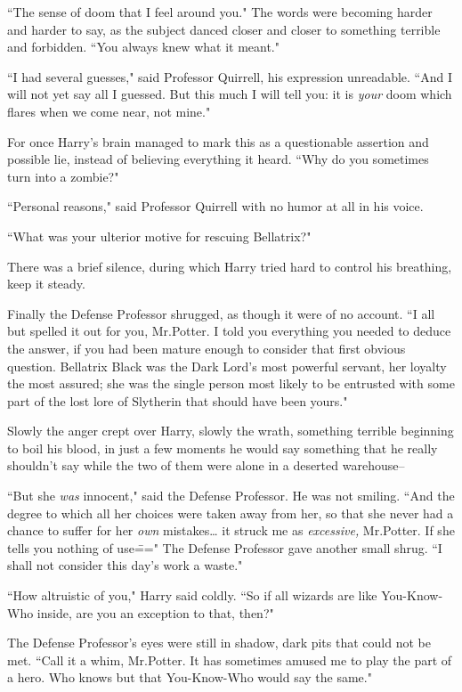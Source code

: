 ``The sense of doom that I feel around you." The words were becoming harder and harder to say, as the subject danced closer and closer to something terrible and forbidden. ``You always knew what it meant."

``I had several guesses," said Professor Quirrell, his expression unreadable. ``And I will not yet say all I guessed. But this much I will tell you: it is \emph{your} doom which flares when we come near, not mine."

For once Harry's brain managed to mark this as a questionable assertion and possible lie, instead of believing everything it heard. ``Why do you sometimes turn into a zombie?"

``Personal reasons," said Professor Quirrell with no humor at all in his voice.

``What was your ulterior motive for rescuing Bellatrix?"

There was a brief silence, during which Harry tried hard to control his breathing, keep it steady.

Finally the Defense Professor shrugged, as though it were of no account. ``I all but spelled it out for you, Mr.\?Potter. I told you everything you needed to deduce the answer, if you had been mature enough to consider that first obvious question. Bellatrix Black was the Dark Lord's most powerful servant, her loyalty the most assured; she was the single person most likely to be entrusted with some part of the lost lore of Slytherin that should have been yours."

Slowly the anger crept over Harry, slowly the wrath, something terrible beginning to boil his blood, in just a few moments he would say something that he really shouldn't say while the two of them were alone in a deserted warehouse\---

``But she \emph{was} innocent," said the Defense Professor. He was not smiling. ``And the degree to which all her choices were taken away from her, so that she never had a chance to suffer for her \emph{own} mistakes{\ldots} it struck me as \emph{excessive,} Mr.\?Potter. If she tells you nothing of use\===" The Defense Professor gave another small shrug. ``I shall not consider this day's work a waste."

``How altruistic of you," Harry said coldly. ``So if all wizards are like You-Know-Who inside, are you an exception to that, then?"

The Defense Professor's eyes were still in shadow, dark pits that could not be met. ``Call it a whim, Mr.\?Potter. It has sometimes amused me to play the part of a hero. Who knows but that You-Know-Who would say the same."

